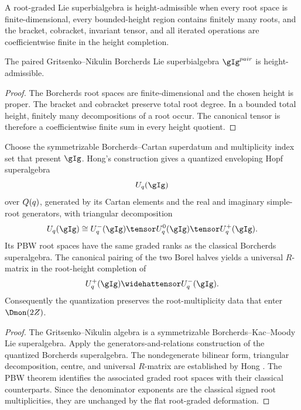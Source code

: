 \begin{definition}
A root-graded Lie superbialgebra is height-admissible when every root space is finite-dimensional, every bounded-height region contains finitely many roots, and the bracket, cobracket, invariant tensor, and all iterated operations are coefficientwise finite in the height completion.
\end{definition}

\begin{proposition}
The paired Gritsenko--Nikulin Borcherds Lie superbialgebra $\gIg^{\mathrm{pair}}$ is height-admissible.
\end{proposition}
\begin{proof}
The Borcherds root spaces are finite-dimensional and the chosen height is proper.  The bracket and cobracket preserve total root degree.  In a bounded total height, finitely many decompositions of a root occur.  The canonical tensor is therefore a coefficientwise finite sum in every height quotient.
\end{proof}

\begin{theorem}
Choose the symmetrizable Borcherds--Cartan superdatum and multiplicity index set that present $\gIg$.  Hong's construction gives a quantized enveloping Hopf superalgebra
\[
 U_q(\gIg)
\]
over $Q(q)$, generated by its Cartan elements and the real and imaginary simple-root generators, with triangular decomposition
\[
 U_q(\gIg)\cong U_q^-(\gIg)\tensor U_q^0(\gIg)\tensor U_q^+(\gIg).
\]
Its PBW root spaces have the same graded ranks as the classical Borcherds superalgebra.  The canonical pairing of the two Borel halves yields a universal $R$-matrix in the root-height completion of
\[
 U_q^+(\gIg)\widehattensor U_q^-(\gIg).
\]
Consequently the quantization preserves the root-multiplicity data that enter $\Dmon(2Z)$.
\end{theorem}
\begin{proof}
The Gritsenko--Nikulin algebra is a symmetrizable Borcherds--Kac--Moody Lie superalgebra.  Apply the generators-and-relations construction of the quantized Borcherds superalgebra.  The nondegenerate bilinear form, triangular decomposition, centre, and universal $R$-matrix are established by Hong \cite{Hong98}.  The PBW theorem identifies the associated graded root spaces with their classical counterparts.  Since the denominator exponents are the classical signed root multiplicities, they are unchanged by the flat root-graded deformation.
\end{proof}

